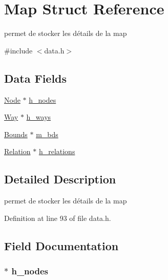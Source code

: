 \hypertarget{struct_map}{}\section{Map Struct Reference}
\label{struct_map}


permet de stocker les détails de la map  




{\ttfamily \#include $<$data.\+h$>$}

\subsection*{Data Fields}
\begin{DoxyCompactItemize}
\item 
\hyperlink{struct_node}{Node} $\ast$ \hyperlink{struct_map_a558e97314f5dee487c68abcd21658877}{h\+\_\+nodes}
\item 
\hyperlink{struct_way}{Way} $\ast$ \hyperlink{struct_map_a255d568bce680d722841b9343f6cc90a}{h\+\_\+ways}
\item 
\hyperlink{struct_bounds}{Bounds} $\ast$ \hyperlink{struct_map_afe75a6a865f0b33f04695c4134b4b37d}{m\+\_\+bds}
\item 
\hyperlink{struct_relation}{Relation} $\ast$ \hyperlink{struct_map_abc1f65a8dd87d50c657bea6a0b157f56}{h\+\_\+relations}
\end{DoxyCompactItemize}


\subsection{Detailed Description}
permet de stocker les détails de la map 

Definition at line 93 of file data.\+h.



\subsection{Field Documentation}
\subsubsection[{\texorpdfstring{h\+\_\+nodes}{h_nodes}}]{$\ast$ h\+\_\+nodes}\hypertarget{struct_map_a558e97314f5dee487c68abcd21658877}{}\label{struct_map_a558e97314f5dee487c68abcd21658877}


